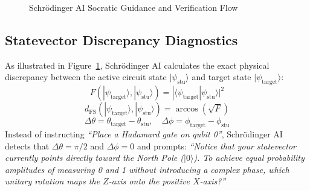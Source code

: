 \documentclass[11pt, a4paper]{article}
\begin{document}
\begin{figure}[htbp]
\begin{singlespace}
\end{singlespace}
\caption{Schr{\"o}dinger AI Socratic Guidance and Verification Flow}
\label{fig:ai_flow}
\end{figure}

\subsection{Statevector Discrepancy Diagnostics}
As illustrated in Figure~\ref{fig:ai_flow}, Schr{\"o}dinger AI calculates the exact physical discrepancy between the active circuit state $|\psi_{\text{stu}}\rangle$ and target state $|\psi_{\text{target}}\rangle$:
\begin{equation}
F(|\psi_{\text{target}}\rangle, |\psi_{\text{stu}}\rangle) = |\langle \psi_{\text{target}} | \psi_{\text{stu}} \rangle|^2
\end{equation}
\begin{equation}
d_{\text{FS}}(|\psi_{\text{target}}\rangle, |\psi_{\text{stu}}\rangle) = \arccos\left(\sqrt{F}\right)
\end{equation}
\begin{equation}
\Delta\theta = \theta_{\text{target}} - \theta_{\text{stu}}, \quad \Delta\phi = \phi_{\text{target}} - \phi_{\text{stu}}
\end{equation}
Instead of instructing \textit{``Place a Hadamard gate on qubit 0''}, Schr{\"o}dinger AI detects that $\Delta\theta = \pi/2$ and $\Delta\phi = 0$ and prompts: \textit{``Notice that your statevector currently points directly toward the North Pole ($|0\rangle$). To achieve equal probability amplitudes of measuring 0 and 1 without introducing a complex phase, which unitary rotation maps the $Z$-axis onto the positive $X$-axis?''}
\end{document}
